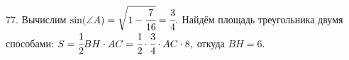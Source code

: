 77. Вычислим $\sin(\angle A)=\sqrt{1-\cfrac{7}{16}}=\cfrac{3}{4}.$ Найдём площадь треугольника двумя способами: $S=\cfrac{1}{2}BH\cdot AC=\cfrac{1}{2}\cdot\cfrac{3}{4}\cdot AC\cdot8,$ откуда $BH=6.$\\
